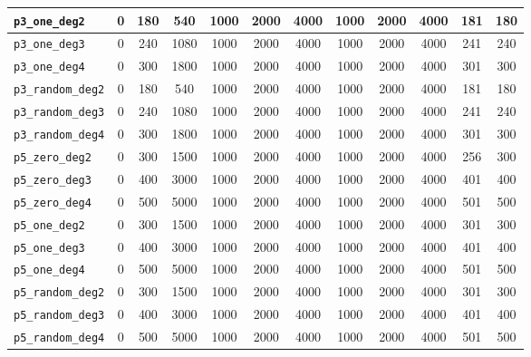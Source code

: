 \begin{landscape}
\begin{table}[H]
{\begin{tabular}{lccccccccccc}
\hline
\texttt{p3\_one\_deg2} & 0 & 180 & 540 & 1000 & 2000 & 4000 & 1000 & 2000 & 4000 & 181 & 180 \\
\hline
\texttt{p3\_one\_deg3} & 0 & 240 & 1080 & 1000 & 2000 & 4000 & 1000 & 2000 & 4000 & 241 & 240 \\
\hline
\texttt{p3\_one\_deg4} & 0 & 300 & 1800 & 1000 & 2000 & 4000 & 1000 & 2000 & 4000 & 301 & 300 \\
\hline
\texttt{p3\_random\_deg2} & 0 & 180 & 540 & 1000 & 2000 & 4000 & 1000 & 2000 & 4000 & 181 & 180 \\
\hline
\texttt{p3\_random\_deg3} & 0 & 240 & 1080 & 1000 & 2000 & 4000 & 1000 & 2000 & 4000 & 241 & 240 \\
\hline
\texttt{p3\_random\_deg4} & 0 & 300 & 1800 & 1000 & 2000 & 4000 & 1000 & 2000 & 4000 & 301 & 300 \\
\hline
\texttt{p5\_zero\_deg2} & 0 & 300 & 1500 & 1000 & 2000 & 4000 & 1000 & 2000 & 4000 & 256 & 300 \\
\hline
\texttt{p5\_zero\_deg3} & 0 & 400 & 3000 & 1000 & 2000 & 4000 & 1000 & 2000 & 4000 & 401 & 400 \\
\hline
\texttt{p5\_zero\_deg4} & 0 & 500 & 5000 & 1000 & 2000 & 4000 & 1000 & 2000 & 4000 & 501 & 500 \\
\hline
\texttt{p5\_one\_deg2} & 0 & 300 & 1500 & 1000 & 2000 & 4000 & 1000 & 2000 & 4000 & 301 & 300 \\
\hline
\texttt{p5\_one\_deg3} & 0 & 400 & 3000 & 1000 & 2000 & 4000 & 1000 & 2000 & 4000 & 401 & 400 \\
\hline
\texttt{p5\_one\_deg4} & 0 & 500 & 5000 & 1000 & 2000 & 4000 & 1000 & 2000 & 4000 & 501 & 500 \\
\hline
\texttt{p5\_random\_deg2} & 0 & 300 & 1500 & 1000 & 2000 & 4000 & 1000 & 2000 & 4000 & 301 & 300 \\
\hline
\texttt{p5\_random\_deg3} & 0 & 400 & 3000 & 1000 & 2000 & 4000 & 1000 & 2000 & 4000 & 401 & 400 \\
\hline
\texttt{p5\_random\_deg4} & 0 & 500 & 5000 & 1000 & 2000 & 4000 & 1000 & 2000 & 4000 & 501 & 500 \\
\bottomrule
\end{tabular}
}%
\end{table}
\end{landscape}


